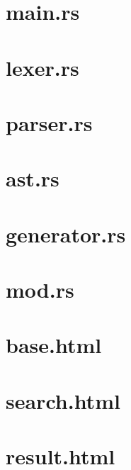 \section{main.rs}

\section{lexer.rs}

\section{parser.rs}

\section{ast.rs}

\section{generator.rs}

\section{mod.rs}

\section{base.html}

\section{search.html}

\section{result.html}
